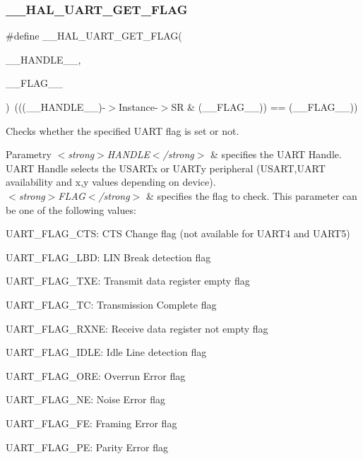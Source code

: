 \subsubsection{\texorpdfstring{\+\_\+\+\_\+\+H\+A\+L\+\_\+\+U\+A\+R\+T\+\_\+\+G\+E\+T\+\_\+\+F\+L\+AG}{\_\_HAL\_UART\_GET\_FLAG}}
{\footnotesize\ttfamily \#define \+\_\+\+\_\+\+H\+A\+L\+\_\+\+U\+A\+R\+T\+\_\+\+G\+E\+T\+\_\+\+F\+L\+AG(\begin{DoxyParamCaption}\item[{}]{\+\_\+\+\_\+\+H\+A\+N\+D\+L\+E\+\_\+\+\_\+,  }\item[{}]{\+\_\+\+\_\+\+F\+L\+A\+G\+\_\+\+\_\+ }\end{DoxyParamCaption})~(((\+\_\+\+\_\+\+H\+A\+N\+D\+L\+E\+\_\+\+\_\+)-\/$>$Instance-\/$>$SR \& (\+\_\+\+\_\+\+F\+L\+A\+G\+\_\+\+\_\+)) == (\+\_\+\+\_\+\+F\+L\+A\+G\+\_\+\+\_\+))}



Checks whether the specified U\+A\+RT flag is set or not. 


\begin{DoxyParams}{Parametry}
{\em $<$strong$>$\+H\+A\+N\+D\+L\+E$<$/strong$>$} & specifies the U\+A\+RT Handle. U\+A\+RT Handle selects the U\+S\+A\+R\+Tx or U\+A\+R\+Ty peripheral (U\+S\+A\+RT,U\+A\+RT availability and x,y values depending on device). \\
\hline
{\em $<$strong$>$\+F\+L\+A\+G$<$/strong$>$} & specifies the flag to check. This parameter can be one of the following values\+: \begin{DoxyItemize}
\item U\+A\+R\+T\+\_\+\+F\+L\+A\+G\+\_\+\+C\+TS\+: C\+TS Change flag (not available for U\+A\+R\+T4 and U\+A\+R\+T5) \item U\+A\+R\+T\+\_\+\+F\+L\+A\+G\+\_\+\+L\+BD\+: L\+IN Break detection flag \item U\+A\+R\+T\+\_\+\+F\+L\+A\+G\+\_\+\+T\+XE\+: Transmit data register empty flag \item U\+A\+R\+T\+\_\+\+F\+L\+A\+G\+\_\+\+TC\+: Transmission Complete flag \item U\+A\+R\+T\+\_\+\+F\+L\+A\+G\+\_\+\+R\+X\+NE\+: Receive data register not empty flag \item U\+A\+R\+T\+\_\+\+F\+L\+A\+G\+\_\+\+I\+D\+LE\+: Idle Line detection flag \item U\+A\+R\+T\+\_\+\+F\+L\+A\+G\+\_\+\+O\+RE\+: Overrun Error flag \item U\+A\+R\+T\+\_\+\+F\+L\+A\+G\+\_\+\+NE\+: Noise Error flag \item U\+A\+R\+T\+\_\+\+F\+L\+A\+G\+\_\+\+FE\+: Framing Error flag \item U\+A\+R\+T\+\_\+\+F\+L\+A\+G\+\_\+\+PE\+: Parity Error flag \end{DoxyItemize}
\\
\hline
\end{DoxyParams}

